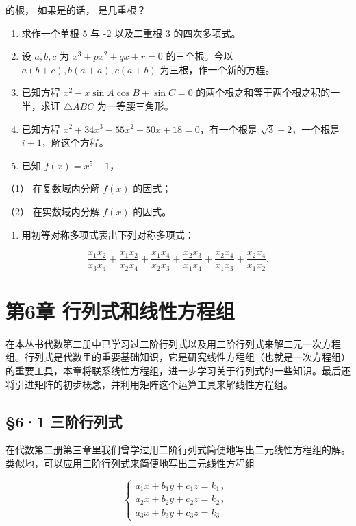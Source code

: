 的根， 如果是的话， 是几重根？

\begin{enumerate}[start=3]
\item
  求作一个单根 5 与 -2 以及二重根 3 的四次多项式。
\item
  设 \(a, b, c\) 为 \(x^3 + px^2 + qx + r = 0\) 的三个根。今以
  \(a(b + c), b(a + a), c(a + b)\) 为三根，作一个新的方程。
\item
  已知方程 \(x^{2} - x\sin A\cos B + \sin C = 0\)
  的两个根之和等于两个根之积的一半，求证 \(\triangle ABC\)
  为一等腰三角形。
\item
  已知方程 \(x^{2} + 34x^{3} - 55x^{2} + 50x + 18 = 0\)，有一个根是
  \(\sqrt{3} - 2\)，一个根是 \(i + 1\)，解这个方程。
\item
  已知 \(f(x) = x^5 - 1\)，
\end{enumerate}

（1） 在复数域内分解 \(f(x)\) 的因式；

（2） 在实数域内分解 \(f(x)\) 的因式。

\begin{enumerate}[start=8]
\item
  用初等对称多项式表出下列对称多项式：
\end{enumerate}

\[
\frac {x _ {1} x _ {2}}{x _ {3} x _ {4}} + \frac {x _ {1} x _ {2}}{x _ {2} x _ {4}} + \frac {x _ {1} x _ {4}}{x _ {2} x _ {3}} + \frac {x _ {2} x _ {3}}{x _ {1} x _ {4}} + \frac {x _ {2} x _ {4}}{x _ {1} x _ {3}} + \frac {x _ {2} x _ {4}}{x _ {1} x _ {2}}.
\]

\chapter{第6章 行列式和线性方程组}

在本丛书代数第二册中已学习过二阶行列式以及用二阶行列式来解二元一次方程组。行列式是代数里的重要基础知识，它是研究线性方程组（也就是一次方程组）的重要工具，本章将联系线性方程组，进一步学习关于行列式的一些知识。最后还将引进矩阵的初步概念，并利用矩阵这个运算工具来解线性方程组。

\section{§6·1 三阶行列式}

在代数第二册第三章里我们曾学过用二阶行列式简便地写出二元线性方程组的解。类似地，可以应用三阶行列式来简便地写出三元线性方程组

\[
\left\{ \begin{array}{l} a _ {1} x + b _ {1} y + c _ {1} z = k _ {1}\text{，} \\ a _ {2} x + b _ {2} y + c _ {2} z = k _ {2}\text{，} \\ a _ {3} x + b _ {3} y + c _ {3} z = k _ {3} \end{array} \right. \tag {I}
\]


